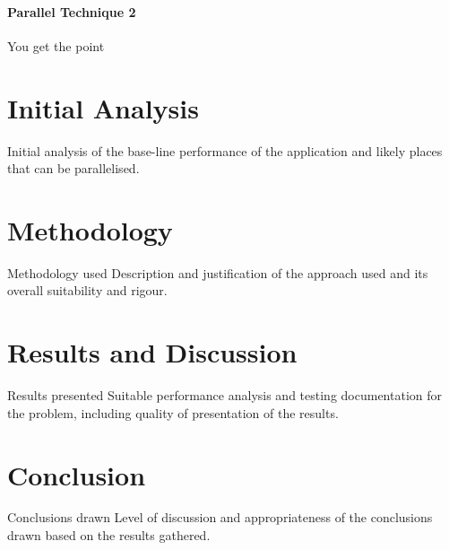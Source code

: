 \documentclass[12pt, conference]{article}
\begin{document}
\paragraph{Parallel Technique 2}
You get the point 

\section{Initial Analysis}
Initial analysis of the base-line performance of the application and likely places that can be parallelised.
\section{Methodology}
Methodology used
Description and justification of the approach used and its overall suitability and rigour.
\section{Results and Discussion}
Results presented
Suitable performance analysis and testing documentation for the problem, including quality of presentation of the results.
\section{Conclusion}
Conclusions drawn
Level of discussion and appropriateness of the conclusions drawn based on the results gathered.




\end{document}
